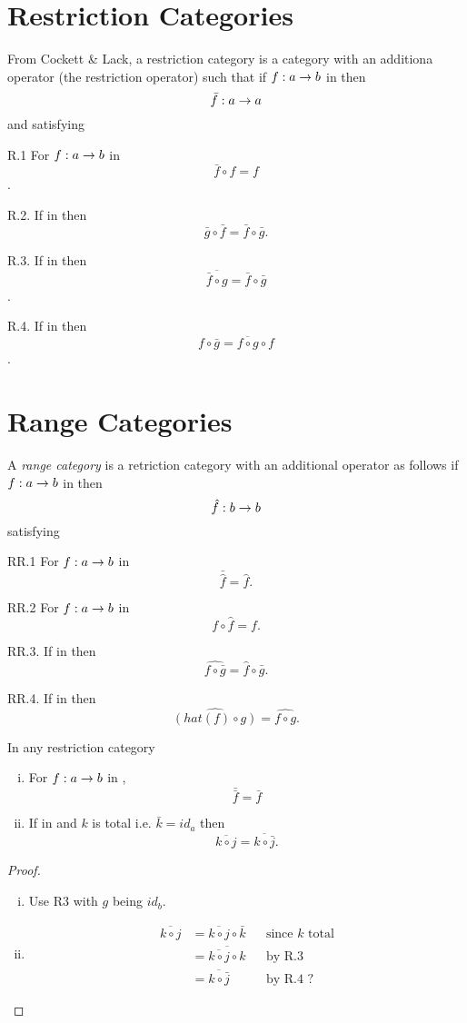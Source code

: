 \documentclass[10pt,a4paper]{article}
\theoremstyle{remark}
\renewcommand{\term}[1]{\textit{#1}}  %
\begin{document}
\section{Restriction Categories}

From Cockett \& Lack, a restriction category is a category \catcw with an additiona operator (the restriction operator) such that
if $f: a \rightarrow b$ in \catcw then
$$\bar{f}: a \rightarrow a$$ 
and satisfying

R.1 For $f:a \rightarrow b$ in \catcw $$\bar{f} \circ f =f$$.

R.2. If \fgsourcediag in \catcw then
$$\bar{g} \circ \bar{f}=\bar{f} \circ \bar{g}.$$

R.3. If \fgsourcediag in \catcw then
$$\overline{\bar{f} \circ g} = \bar{f} \circ \bar{g}$$.

R.4. If  in \catcw then
$$f \circ \bar{g} = \overline{f \circ g} \circ f$$.

\section{Range Categories}

A \term{range category} is a retriction category with an additional operator as follows
if $f: a \rightarrow b$ in  \catcw then
$$\hat{f}: b \rightarrow b$$
satisfying

RR.1 For $f:a \rightarrow b$ in \catcw $$\bar{\hat{f}} = \hat{f}.$$

RR.2 For $f:a \rightarrow b$ in \catcw $$f \circ \hat{f} = f.$$

RR.3. If  in \catcw then
$$\widehat{f \circ \bar{g}} = \hat{f} \circ \bar{g}.$$

RR.4. If  in \catcw then
$$\widehat{(hat({f}) \circ g)} = \widehat{f \circ g}.$$

\begin{lemma}
\label{restrictioncatlemma}
In any restriction category \catc
\begin{enumerate} [(i)]
\item For $f:a \rightarrow b$ in \catcw,
$$\bar{\bar{f}}=\bar{f}$$
\item If  in \catcw 
and $k$ is total i.e. $\bar{k}=id_a$ then
$$\overline{k \circ j} = \overline{k \circ \bar{j}}.$$
\end{enumerate}
\end{lemma}
\begin{proof}
\begin{enumerate} [(i)]
\item Use R3 with $g$ being $id_b$.
\item 
\begin{align*}
\overline{k \circ j} &= \overline{k \circ j} \circ \bar{k}    && \mbox{since $k$ total}\\
                     &= \overline{\overline{k \circ j} \circ k} && \mbox{by R.3} \\
                     &= \overline{k \circ \bar{j}}              && \mbox{by R.4 ?}
\end{align*}
\end{enumerate}
\end{proof}
\end{document}
